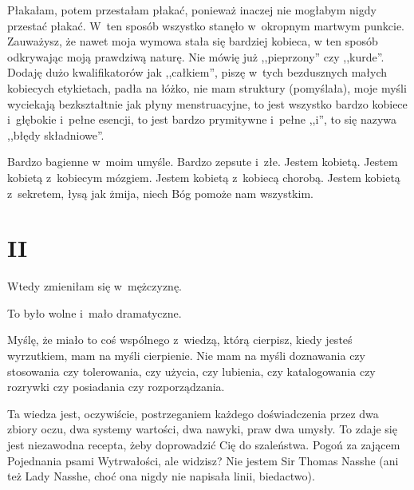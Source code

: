 \documentclass[oneside,polish,12pt,sfheadings]{mwbk}
\begin{document}
Płakałam, potem przestałam płakać, ponieważ inaczej nie mogłabym nigdy
przestać płakać. W~ten sposób wszystko stanęło w~okropnym martwym
punkcie. Zauważysz, że nawet moja wymowa stała się bardziej kobieca,
w ten sposób odkrywając moją prawdziwą naturę. Nie mówię już ,,pieprzony''
czy ,,kurde''. Dodaję dużo kwalifikatorów jak ,,całkiem'', piszę w~tych bezdusznych małych kobiecych etykietach, padła na łóżko, nie
mam struktury (pomyślała), moje myśli wyciekają bezkształtnie jak
płyny menstruacyjne, to jest wszystko bardzo kobiece i~głębokie i~pełne esencji, to jest bardzo prymitywne i~pełne ,,i'', to się nazywa
,,błędy składniowe''.

Bardzo bagienne w~moim umyśle. Bardzo zepsute i~złe. Jestem kobietą.
Jestem kobietą z~kobiecym mózgiem. Jestem kobietą z~kobiecą chorobą.
Jestem kobietą z~sekretem, łysą jak żmija, niech Bóg pomoże nam wszystkim.

\chapter{II}

Wtedy zmieniłam się w~mężczyznę.

To było wolne i~mało dramatyczne.

Myślę, że miało to coś wspólnego z~wiedzą, którą cierpisz, kiedy
jesteś wyrzutkiem, mam na myśli cierpienie. Nie mam na myśli doznawania
czy stosowania czy tolerowania, czy użycia, czy lubienia, czy katalogowania
czy rozrywki czy posiadania czy rozporządzania.

Ta wiedza jest, oczywiście, postrzeganiem każdego doświadczenia przez
dwa zbiory oczu, dwa systemy wartości, dwa nawyki, praw dwa umysły.
To zdaje się jest niezawodna recepta, żeby doprowadzić Cię do szaleństwa.
Pogoń za zającem Pojednania psami Wytrwałości, ale widzisz? Nie jestem
Sir Thomas Nasshe (ani też Lady Nasshe, choć ona nigdy nie napisała
linii, biedactwo).
\end{document}
